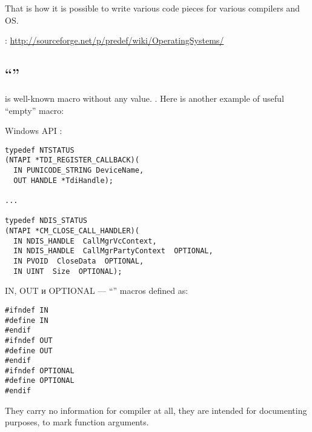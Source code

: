 {That is how it is possible to write various code pieces for various compilers and} \ac{OS}.

:
\url{http://sourceforge.net/p/predef/wiki/OperatingSystems/}

\subsection{``'' }

{ is well-known macro without any value}.
.
{Here is another example of useful ``empty'' macro}:

 Windows API :

\begin{lstlisting}
typedef NTSTATUS
(NTAPI *TDI_REGISTER_CALLBACK)(
  IN PUNICODE_STRING DeviceName,
  OUT HANDLE *TdiHandle);

...

typedef NDIS_STATUS
(NTAPI *CM_CLOSE_CALL_HANDLER)(
  IN NDIS_HANDLE  CallMgrVcContext,
  IN NDIS_HANDLE  CallMgrPartyContext  OPTIONAL,
  IN PVOID  CloseData  OPTIONAL,
  IN UINT  Size  OPTIONAL);
\end{lstlisting}

IN, OUT и OPTIONAL ---  ``'' 
{macros defined as}:

\begin{lstlisting}
#ifndef IN
#define IN
#endif
#ifndef OUT
#define OUT
#endif
#ifndef OPTIONAL
#define OPTIONAL
#endif
\end{lstlisting}

{They carry no information for compiler at all, they are intended for documenting purposes,
to mark function arguments}.

\subsection{}

